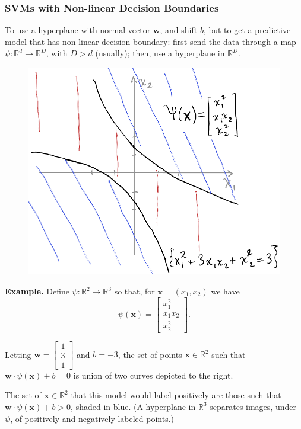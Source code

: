 \documentclass[smaller]{beamer}
\theoremstyle{example}
\newcommand{\x}{\textbf{x}}
\begin{document}
\begin{frame}
    \frametitle{SVMs with Non-linear Decision Boundaries}
    To use a hyperplane with normal vector $\textbf{w}$, and shift $b$, but to get a predictive model that has non-linear decision boundary: first send the data through a map $\psi:\mathbb R^d \to \mathbb R^D$, with $D > d$ (usually); then, use a hyperplane in $\mathbb R^D$.
    \pause

    \medskip
    \begin{minipage}{\textwidth}
        \begin{figure}
            \centering
            \includegraphics[height=0.35\textheight]{../../Images/kernel-figure.png}
        \end{figure}

    \textbf{Example.} Define $\psi:\mathbb R^2 \to \mathbb R^3$ so that, for \mbox{$\x=(x_1,x_2)$} we have 
    \vspace{-6pt}
    \[\psi(\x) = \begin{bmatrix}x_1^2 \\ x_1x_2 \\ x_2^2\end{bmatrix}.\]
    \vspace{-6pt}
    
    \pause
    Letting $\textbf{w} = \begin{bmatrix}1 \\ 3\\ 1\end{bmatrix}$ and $b = -3$, the set of points $\x\in\mathbb R^2$ such that $\textbf{w}\cdot\psi(\x) + b = 0$ is union of two curves depicted to the right.
    \end{minipage}
    \pause

    \medskip
    The set of $\x\in\mathbb R^2$ that this model would label positively are those such that $\textbf{w}\cdot\psi(\x) + b > 0$, shaded in blue. (A hyperplane in $\mathbb R^3$ separates images, under $\psi$, of positively and negatively labeled points.)
\end{frame}
\end{document}
